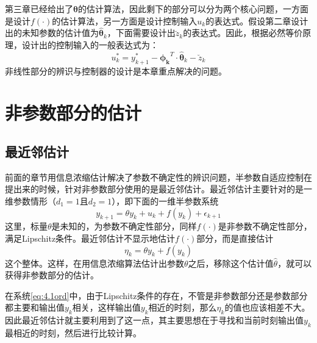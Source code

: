 第三章已经给出了$\bm{\theta}$的估计算法，因此剩下的部分可以分为两个核心问题，一方面是设计$f(\cdot)$的估计算法，另一方面是设计控制输入$u_{k}$的表达式。假设第二章设计出的未知参数的估计值为$\hat{\bm{\theta}}_{k}$，下面需要设计出$\breve{z}_{k}$的表达式。因此，根据必然等价原理，设计出的控制输入的一般表达式为：
\begin{equation}\label{eq:4.uk}
u_{k}^{*}=y_{k+1}^{*}-\bm{\phi_{k}}^{T}\cdot\hat{\bm{\theta}}_{k}-\breve{z}_{k}
\end{equation}
非线性部分的辨识与控制器的设计是本章重点解决的问题。

\section{非参数部分的估计}\label{sect:4.2}
\subsection{最近邻估计}
前面的章节用信息浓缩估计解决了参数不确定性的辨识问题，半参数自适应控制在提出来的时候，针对非参数部分使用的是最近邻估计。最近邻估计主要针对的是一维参数情形（$d_{1}=1$且$d_{2}=1$），即下面的一维半参数系统
\begin{equation}%
\label{eq:4.1ord}
y_{k+1}=\theta y_{k}+u_{k}+f(y_{k})+\epsilon_{k+1}
\end{equation}
这里，标量$\theta$是未知的，为参数不确定性部分，同样$f(\cdot)$是非参数不确定性部分，满足Lipschitz条件。最近邻估计不显示地估计$f(\cdot)$部分，而是直接估计
\begin{equation}\label{eq:4.nne.g}
\eta_{k} = \theta y_{k}+f(y_{k})
\end{equation}
这个整体。这样，在用信息浓缩算法估计出参数$\theta$之后，移除这个估计值$\hat{\theta}$，就可以获得非参数部分的估计。

在系统\eqref{eq:4.1ord}中，由于Lipschitz条件的存在，不管是非参数部分还是参数部分都主要和输出值$y_{k}$相关，这样输出值$y_{k}$相近的时刻，那么$\eta_{k}$的值也应该相差不大。因此最近邻估计就主要利用到了这一点，其主要思想在于寻找和当前时刻输出值$y_{k}$最相近的时刻，然后进行比较计算。

